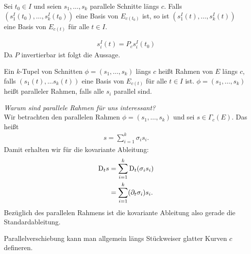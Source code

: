 \begin{lem}
\label{lem:BasisVB}
Sei $t_0 \in I$ und seien $s_1, \dots, s_k$ parallele Schnitte längs $c$.
Falls $(s^I_1 (t_0), \dots, s^I_k (t_0))$ eine Basis von $E_{c(t_0)}$ ist, so ist $(s^I_1 (t), \dots, s^I_k (t))$ eine Basis von $E_{c(t)}$ für alle $t \in I$.
\end{lem}
\begin{bew}
\begin{align*}
s^I_i (t) = P_c s^I_i (t_0)
\end{align*}
Da $P$ invertierbar ist folgt die Aussage.%
\end{bew}
\begin{defs}
Ein $k$-Tupel von Schnitten $\phi = (s_1, \dots, s_k)$ längs $c$ heißt Rahmen von $E$ längs $c$, falls $(s_1(t), \dots s_k(t))$ eine Basis von $E_{c(t)}$ für alle $t \in I$ ist.
$\phi = (s_1, \dots, s_k)$ heißt paralleler Rahmen, falls alle $s_i$ parallel sind.
\end{defs}
\textit{Warum sind parallele Rahmen für uns interessant?}\\
Wir betrachten den parallelen Rahmen $\phi = (s_1, \dots, s_k)$ und sei $s \in \Gamma_c (E)$.
Das heißt 
\begin{align*}
s= \sum^{k}_{i=1} \sigma_i s_i.
\end{align*}
Damit erhalten wir für die kovariante Ableitung:
\begin{align}
\mathrm{D}_t s &= \sum^{k}_{i=1} \mathrm{D}_t (\sigma_i s_i)\\
&= \sum^{k}_{i=1} (\partial_t \sigma_i) s_i. 
\end{align}
Bezüglich des parallelen Rahmens ist die kovariante Ableitung also gerade die Standardableitung.
\begin{bem}
Parallelverschiebung kann man allgemein längs Stückweiser glatter Kurven $c$ defineren.
\end{bem}


